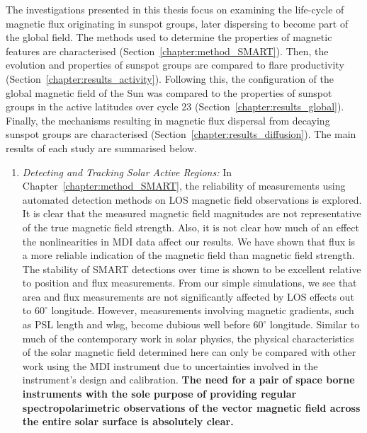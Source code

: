 The investigations presented in this thesis focus on examining the life-cycle of magnetic flux originating in sunspot groups, later dispersing to become part of the global field. The methods used to determine the properties of magnetic features are characterised (Section~\ref{chapter:method_SMART}). Then, the evolution and properties of sunspot groups are compared to flare productivity (Section~\ref{chapter:results_activity}). Following this, the configuration of the global magnetic field of the Sun was compared to the properties of sunspot groups in the active latitudes over cycle 23 (Section~\ref{chapter:results_global}). Finally, the mechanisms resulting in magnetic flux dispersal from decaying sunspot groups are characterised (Section~\ref{chapter:results_diffusion}). The main results of each study are summarised below.
\begin{enumerate}
\item \emph{Detecting and Tracking Solar Active Regions:} In Chapter~\ref{chapter:method_SMART}, the reliability of measurements using automated detection methods on \gls{LOS} magnetic field observations is explored. It is clear that the measured magnetic field magnitudes are not representative of the true magnetic field strength. Also, it is not clear how much of an effect the nonlinearities in \gls{MDI} data affect our results. We have shown that flux is a more reliable indication of the magnetic field than magnetic field strength. The stability of \gls{SMART} detections over time is shown to be excellent relative to position and flux measurements. From our simple simulations, we see that area and flux measurements are not significantly affected by \gls{LOS} effects out to $60^{\circ}$ longitude. However, measurements involving magnetic gradients, such as \gls{PSL} length and \gls{wlsg}, become dubious well before $60^{\circ}$ longitude. Similar to much of the contemporary work in solar physics, the physical characteristics of the solar magnetic field determined here can only be compared with other work using the \gls{MDI} instrument due to uncertainties involved in the instrument's design and calibration. {\bf The need for a pair of space borne instruments with the sole purpose of providing regular spectropolarimetric observations of the vector magnetic field across the entire solar surface is absolutely clear.}

\end{enumerate}
